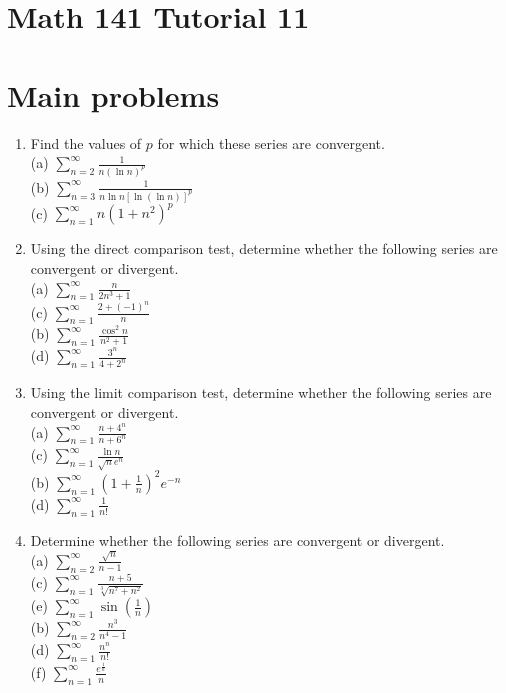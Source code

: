 \documentclass[10pt]{article}
\begin{document}
\section*{Math 141 Tutorial 11}
\section*{Main problems}
\begin{enumerate}
  \item Find the values of $p$ for which these series are convergent.\\
(a) $\sum_{n=2}^{\infty} \frac{1}{n(\ln n)^{p}}$\\
(b) $\sum_{n=3}^{\infty} \frac{1}{n \ln n[\ln (\ln n)]^{p}}$\\
(c) $\sum_{n=1}^{\infty} n\left(1+n^{2}\right)^{p}$
  \item Using the direct comparison test, determine whether the following series are convergent or divergent.\\
(a) $\sum_{n=1}^{\infty} \frac{n}{2 n^{3}+1}$\\
(c) $\sum_{n=1}^{\infty} \frac{2+(-1)^{n}}{n}$\\
(b) $\sum_{n=1}^{\infty} \frac{\cos ^{2} n}{n^{2}+1}$\\
(d) $\sum_{n=1}^{\infty} \frac{3^{n}}{4+2^{n}}$
  \item Using the limit comparison test, determine whether the following series are convergent or divergent.\\
(a) $\sum_{n=1}^{\infty} \frac{n+4^{n}}{n+6^{n}}$\\
(c) $\sum_{n=1}^{\infty} \frac{\ln n}{\sqrt{n} e^{n}}$\\
(b) $\sum_{n=1}^{\infty}\left(1+\frac{1}{n}\right)^{2} e^{-n}$\\
(d) $\sum_{n=1}^{\infty} \frac{1}{n!}$
  \item Determine whether the following series are convergent or divergent.\\
(a) $\sum_{n=2}^{\infty} \frac{\sqrt{n}}{n-1}$\\
(c) $\sum_{n=1}^{\infty} \frac{n+5}{\sqrt[3]{n^{7}+n^{2}}}$\\
(e) $\sum_{n=1}^{\infty} \sin \left(\frac{1}{n}\right)$\\
(b) $\sum_{n=2}^{\infty} \frac{n^{3}}{n^{4}-1}$\\
(d) $\sum_{n=1}^{\infty} \frac{n^{n}}{n!}$\\
(f) $\sum_{n=1}^{\infty} \frac{e^{\frac{1}{n}}}{n}$
\end{enumerate}
\end{document}
